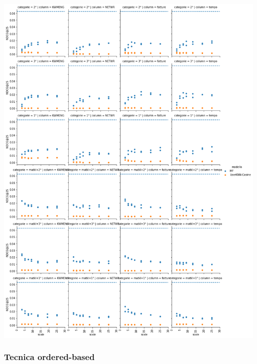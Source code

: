 \includegraphics[width=16cm]{figures/risultati_minmax_categoria_totale.png}


\subsubsection{Tecnica ordered-based}

